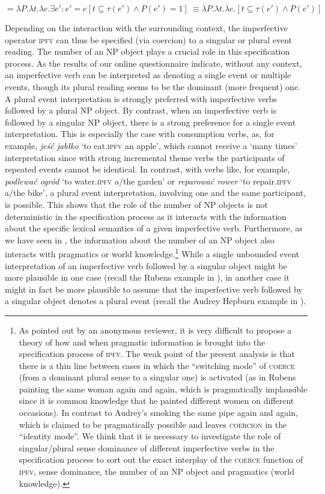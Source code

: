 \documentclass[output=paper]{langscibook}
\begin{document}
\ea {} $= \lambda P. \lambda t.\lambda e. \exists e': e'=e [t \subseteq \tau(e') \wedge P(e')=1] 
\ \equiv \lambda P. \lambda t.\lambda e. [t \subseteq \tau(e') \wedge P(e')]$\label{jan-bla:fansb:kb:ex31}
\z 

\noindent Depending on the interaction with the surrounding context, the imperfective operator \textsc{ipfv} can thus be specified (via coercion) to a singular or plural event reading. The number of an NP object plays a crucial role in this specification process. As the results of our online questionnaire indicate, without any context, an imperfective verb can be interpreted as denoting a single event or multiple events, though its plural reading seems to be the dominant (more frequent) one. A plural event interpretation is strongly preferred with imperfective verbs followed by a plural NP object. By contrast, when an imperfective verb is followed by a singular NP object, there is a strong preference for a single event interpretation. This is especially the case with consumption verbs, as, for example, \textit{jeść jabłko} ‘to eat.\textsc{ipfv} an apple’, which cannot receive a ‘many times’ interpretation since with strong incremental theme verbs the participants of repeated events cannot be identical. In contrast, with verbs like, for example, \textit{podlewać ogród} ‘to water.\textsc{ipfv} a/the garden’ or \textit {reparować rower} ‘to repair.\textsc{ipfv} a/the bike’, a plural event interpretation, involving one and the same participant, is possible. This shows that the role of the number of NP objects is not deterministic in the specification process as it interacts with the information about the specific lexical semantics of a given imperfective verb. Furthermore, as we have seen in , the information about the number of an NP object also interacts with pragmatics or world knowledge.\footnote{As pointed out by an anonymous reviewer, it is very difficult to propose a theory of how and when pragmatic information is brought into the specification process of \textsc{ipfv}. The weak point of the present analysis is that there is a thin line between cases in which the “switching mode” of \textsc{coerce} (from a dominant plural sense to a singular one) is activated (as in Rubens painting the same woman again and again, which is pragmatically implausible since it is common knowledge that he painted different women on different occasions). In contrast to Audrey’s smoking the same pipe again and again, which is claimed to be pragmatically possible and leaves \textsc{coercion} in the “identity mode”. We think that it is necessary to investigate the role of singular/plural sense dominance of different imperfective verbs in the specification process to sort out the exact interplay of the \textsc{coerce} function of \textsc{ipfv}, sense dominance, the number of an NP object and pragmatics (world knowledge). 
} While a single unbounded event interpretation of an imperfective verb followed by a singular object might be more plausible in one case (recall the Rubens example in ), in another case it might in fact be more plausible to assume that the imperfective verb followed by a singular object denotes a plural event (recall the Audrey Hepburn example in ). 
\end{document}

